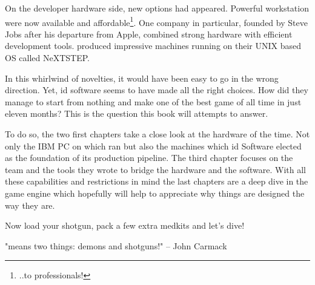  \par
 On the developer hardware side, new options had appeared. Powerful workstation were now available and affordable\footnote{..to professionals!}. One company in particular, founded by Steve Jobs after his departure from Apple, combined strong hardware with efficient development tools. \NeXT produced impressive machines running on their UNIX based OS called NeXTSTEP.\\%
 \par
 In this whirlwind of novelties, it would have been easy to go in the wrong direction. Yet, id software seems to have made all the right choices. How did they manage to start from nothing and make one of the best game of all time in just eleven months? This is the question this book will attempts to answer.\\
 \par
 To do so, the two first chapters take a close look at the hardware of the time. Not only the IBM PC on which \doom{}ran but also the \NeXT machines which id Software elected as the foundation of its production pipeline. The third chapter focuses on the team and the tools they wrote to bridge the hardware and the software. With all these capabilities and restrictions in mind the last chapters are a deep dive in the game engine which hopefully will help to appreciate why things are designed the way they are.\\
\par
Now load your shotgun, pack a few extra medkits and let's dive!\\
\par
\centering "\doom{}means two things: demons and shotguns!" -- John Carmack

